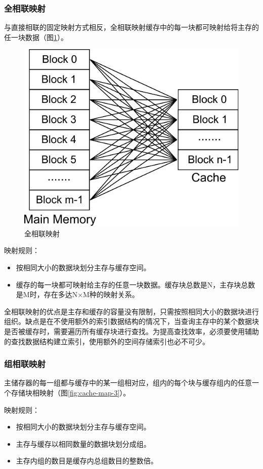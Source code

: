 \subsubsection{全相联映射}

与直接相联的固定映射方式相反，全相联映射缓存中的每一块都可映射给将主存的任一块数据（图\ref{fig:cache-map-2}）。

\begin{figure}[H]
\centering
\includegraphics[width=0.4\linewidth]{./graph/cache-map-2}
\caption{全相联映射}
\label{fig:cache-map-2}
\end{figure}

映射规则：
\begin{itemize}
\item 按相同大小的数据块划分主存与缓存空间。
\item 缓存的每一块都可映射给主存的任意一块数据。缓存块总数是N，主存块总数是M时，存在多达N×M种的映射关系。
\end{itemize}

全相联映射的优点是主存和缓存的容量没有限制，只需按照相同大小的数据块进行组织。缺点是在不使用额外的索引数据结构的情况下，当查询主存中的某个数据块是否被缓存时，需要遍历所有缓存块进行查找。为提高查找效率，必须要使用辅助的查找数据结构建立索引，使用额外的空间存储索引也必不可少。

\subsubsection{组相联映射}

主储存器的每一组都与缓存中的某一组相对应，组内的每个块与缓存组内的任意一个存储块相映射（图\ref{fig:cache-map-3}）。

映射规则：
\begin{itemize}
\item 按相同大小的数据块划分主存与缓存空间。
\item 主存与缓存以相同数量的数据块划分成组。
\item 主存内组的数目是缓存内总组数目的整数倍。
\end{itemize}

